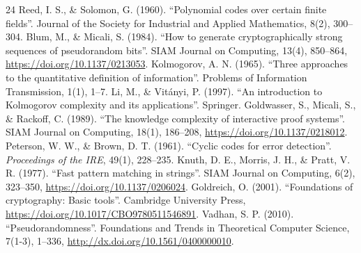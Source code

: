 \documentclass[12pt,a4paper]{article}
\begin{document}
\begin{thebibliography}{24}
\medskip
{} Reed, I. S., \& Solomon, G. (1960). ``Polynomial codes over certain finite fields''. Journal of the Society for Industrial and Applied Mathematics, 8(2), 300--304.
\medskip
{} Blum, M., \& Micali, S. (1984). ``How to generate cryptographically strong sequences of pseudorandom bits''. SIAM Journal on Computing, 13(4), 850--864, \url{https://doi.org/10.1137/0213053}.
\medskip
{} Kolmogorov, A. N. (1965). ``Three approaches to the quantitative definition of information''. Problems of Information Transmission, 1(1), 1--7.
\medskip
{} Li, M., \& Vitányi, P. (1997). ``An introduction to Kolmogorov complexity and its applications''. Springer.
\medskip
{} Goldwasser, S., Micali, S., \& Rackoff, C. (1989). ``The knowledge complexity of interactive proof systems''. SIAM Journal on Computing, 18(1), 186--208, \url{https://doi.org/10.1137/0218012}.
\medskip
{} Peterson, W. W., \& Brown, D. T. (1961). ``Cyclic codes for error detection''. \textit{Proceedings of the IRE}, 49(1), 228--235.
\medskip
{} Knuth, D. E., Morris, J. H., \& Pratt, V. R. (1977). ``Fast pattern matching in strings''. SIAM Journal on Computing, 6(2), 323--350, \url{https://doi.org/10.1137/0206024}.
\medskip
{} Goldreich, O. (2001). ``Foundations of cryptography: Basic tools''. Cambridge University Press, \url{https://doi.org/10.1017/CBO9780511546891}.
\medskip
{} Vadhan, S. P. (2010). ``Pseudorandomness''. Foundations and Trends in Theoretical Computer Science, 7(1-3), 1--336, \url{http://dx.doi.org/10.1561/0400000010}.
\end{thebibliography}
\end{document}
